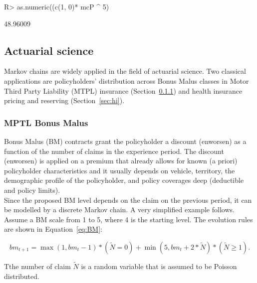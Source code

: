 \documentclass[nojss]{jss}
\begin{document}
\begin{Schunk}
\begin{Sinput}
R> as.numeric((c(1, 0)* mcP ^ 5) %
\end{Sinput}
\begin{Soutput}
[1] 48.96009
\end{Soutput}
\end{Schunk}
\subsection{Actuarial science}\label{app:act}

Markov chains are widely applied in the field of actuarial science. Two
classical applications are policyholders' distribution across Bonus Malus
classes in Motor Third Party Liability (MTPL) insurance (Section~\ref{sec:bm}) and health insurance pricing and reserving 
(Section~\ref{sec:hi}).


\subsubsection{MPTL Bonus Malus}\label{sec:bm}

Bonus Malus (BM) contracts grant the policyholder a discount (enworsen) as a
function of the number of claims in the experience period. The discount (enworsen) is applied on a premium that 
already allows for known (a priori) policyholder characteristics \citep{denuit2007actuarial}
and it usually depends on vehicle, territory, the demographic profile of the policyholder, and policy coverages deep (deductible and policy limits).\\
Since the proposed BM level depends on the claim on the previous period, it can
be modelled by a discrete Markov chain. A very simplified example follows.
Assume a BM scale from 1 to 5, where 4 is the starting level. The evolution rules are shown in Equation~\ref{eq:BM}:

\begin{equation}
bm_{t + 1} = \max \left( {1,bm_{t} - 1} \right)*\left( {\tilde N = 0} \right) + \min \left( {5,bm_{t} + 2*\tilde N} \right)*\left( {\tilde N \ge 1} \right).
\label{eq:BM}
\end{equation}

Tthe number of claim $\tilde N$  is a random variable that is assumed
to be Poisson distributed.
\end{document}
